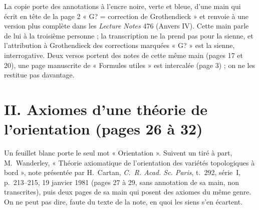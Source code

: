 \documentclass[11pt,a4paper]{article}
\begin{document}
La copie porte des annotations à l'encre noire, verte et bleue, d'une main
qui écrit en tête de la page 2 « G? = correction de Grothendieck » et renvoie
à une version plus complète dans les \emph{Lecture Notes} 476 (Anvers IV). Cette
main parle de lui à la troisième personne ; la transcription ne la prend pas
pour la sienne, et l'attribution à Grothendieck des corrections marquées
« G? » est la sienne, interrogative. Deux versos portent des notes de cette
même main (pages 17 et 20), une page manuscrite de « Formules utiles » est
intercalée (page 3) ; on ne les restitue pas davantage.

\section*{II. Axiomes d'une théorie de l'orientation (pages 26 à 32)}

Un feuillet blanc porte le seul mot « Orientation ». Suivent un tiré à part,
M.~Wanderley, « Théorie axiomatique de l'orientation des variétés
topologiques à bord », note présentée par H.~Cartan, \emph{C.~R. Acad. Sc.
Paris}, t.~292, série~I, p.~213--215, 19 janvier 1981 (pages 27 à 29, sans
annotation de sa main, non transcrites), puis deux pages de sa main qui
posent des axiomes du même genre. On ne peut pas dire, faute du texte de la
note, en quoi les siens s'en écartent.
\end{document}
